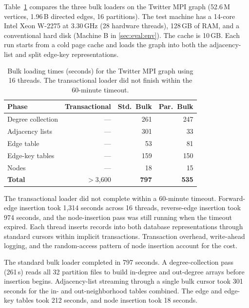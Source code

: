 Table~\ref{tab:bulk-load-times} compares the three bulk loaders on the Twitter MPI graph (52.6\,M vertices, 1.96\,B directed edges, 16 partitions).
The test machine has a 14-core Intel Xeon W-2275 at 3.30\,GHz (28 hardware threads), 128\,GB of RAM, and a conventional hard disk (Machine B in \autoref{sec:eval:env}).
The \wt{} cache is 10\,GB.
Each run starts from a cold page cache and loads the graph into both the adjacency-list and split edge-key representations.

\begin{table}[t]
\centering
\begin{tabular}{lrrr}
\toprule
Phase & Transactional & Std.\ Bulk & Par.\ Bulk \\
\midrule
Degree collection    & ---           & 261 & 247 \\
Adjacency lists      & ---           & 301 &  33 \\
Edge table           & ---           &  53 &  81 \\
Edge-key tables      & ---           & 159 & 150 \\
Nodes                & ---           &  18 &  15 \\
\midrule
\textbf{Total}       & $>$3{,}600    & \textbf{797} & \textbf{535} \\
\bottomrule
\end{tabular}
\caption{Bulk loading times (seconds) for the Twitter MPI graph using 16 threads.
The transactional loader did not finish within the 60-minute timeout.}
\label{tab:bulk-load-times}
\end{table}

The transactional loader did not complete within a 60-minute timeout.
Forward-edge insertion took 1{,}314 seconds across 16 threads, reverse-edge insertion took 974 seconds, and the node-insertion pass was still running when the timeout expired.
Each thread inserts records into both database representations through standard cursors within implicit transactions.
Transaction overhead, write-ahead logging, and the random-access pattern of node insertion account for the cost.

The standard \wt{} bulk loader completed in 797 seconds.
A degree-collection pass (261\,s) reads all 32 partition files to build in-degree and out-degree arrays before insertion begins.
Adjacency-list streaming through a single bulk cursor took 301 seconds for the in- and out-neighborhood tables combined.
The edge and edge-key tables took 212 seconds, and node insertion took 18 seconds.

